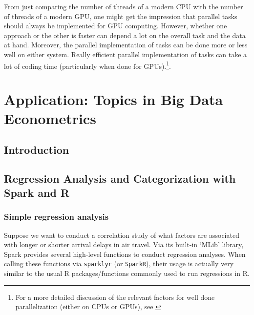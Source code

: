 \documentclass[
  12pt,
]{style/krantz}
\begin{document}
From just comparing the number of threads of a modern CPU with the number of threads of a modern GPU, one might get the impression that parallel tasks should always be implemented for GPU computing. However, whether one approach or the other is faster can depend a lot on the overall task and the data at hand. Moreover, the parallel implementation of tasks can be done more or less well on either system. Really efficient parallel implementation of tasks can take a lot of coding time (particularly when done for GPUs).\footnote{For a more detailed discussion of the relevant factors for well done parallelization (either on CPUs or GPUs), see \citet{matloff_2015}}.

\hypertarget{part-application-topics-in-big-data-econometrics}{%
\part{Application: Topics in Big Data Econometrics}\label{part-application-topics-in-big-data-econometrics}}

\hypertarget{a}{%
\chapter*{Introduction}\label{a}}



\hypertarget{regression-analysis-and-categorization-with-spark-and-r}{%
\chapter{Regression Analysis and Categorization with Spark and R}\label{regression-analysis-and-categorization-with-spark-and-r}}

\hypertarget{simple-regression-analysis}{%
\section{Simple regression analysis}\label{simple-regression-analysis}}

Suppose we want to conduct a correlation study of what factors are associated with longer or shorter arrival delays in air travel. Via its built-in `MLib' library, Spark provides several high-level functions to conduct regression analyses. When calling these functions via \texttt{sparklyr} (or \texttt{SparkR}), their usage is actually very similar to the usual R packages/functions commonly used to run regressions in R.
\end{document}
